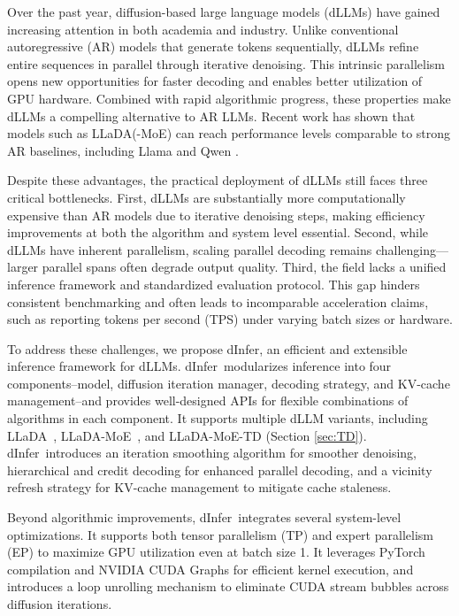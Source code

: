 \documentclass[]{antgroup}
\newcommand{\sys}{dInfer}
\newcommand{\lladamoe}{LLaDA-MoE}
\begin{document}
Over the past year, diffusion-based large language models (dLLMs) have gained increasing attention in both academia and industry. Unlike conventional autoregressive (AR) models that generate tokens sequentially, dLLMs refine entire sequences in parallel through iterative denoising. This intrinsic parallelism opens new opportunities for faster decoding and enables better utilization of GPU hardware. Combined with rapid algorithmic progress, these properties make dLLMs a compelling alternative to AR LLMs. Recent work has shown that models such as LLaDA(-MoE) \citep{nie2025llada,zhu2025lladamoe} can reach performance levels comparable to strong AR baselines, including Llama \citep{grattafiori2024llama3} and Qwen \citep{yang2024qwen2_5}.

Despite these advantages, the practical deployment of dLLMs still faces three critical bottlenecks. First, dLLMs are substantially more computationally expensive than AR models due to iterative denoising steps, making efficiency improvements at both the algorithm and system level essential. Second, while dLLMs have inherent parallelism, scaling parallel decoding remains challenging—larger parallel spans often degrade output quality. Third, the field lacks a unified inference framework and standardized evaluation protocol. This gap hinders consistent benchmarking and often leads to incomparable acceleration claims, such as reporting tokens per second (TPS) under varying batch sizes or hardware.

To address these challenges, we propose \sys, an efficient and extensible inference framework for dLLMs. \sys~modularizes inference into four components--model, diffusion iteration manager, decoding strategy, and KV-cache management--and provides well-designed APIs for flexible combinations of algorithms in each component. It supports multiple dLLM variants, including LLaDA~\citep{nie2025llada}, \lladamoe~\citep{zhu2025lladamoe}, and \lladamoe-TD (Section \ref{sec:TD}). \sys~introduces an iteration smoothing algorithm for smoother
\newpage
denoising, hierarchical and credit decoding for enhanced parallel decoding, and a vicinity refresh strategy for KV-cache management to mitigate cache staleness.

Beyond algorithmic improvements, \sys~integrates several system-level optimizations. It supports both tensor parallelism (TP) and expert parallelism (EP) to maximize GPU utilization even at batch size 1. It leverages PyTorch compilation and NVIDIA CUDA Graphs for efficient kernel execution, and introduces a loop unrolling mechanism to eliminate CUDA stream bubbles across diffusion iterations.
\end{document}
